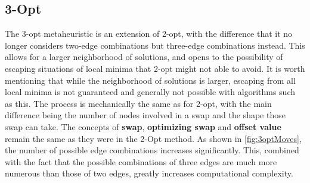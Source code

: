 \subsection{3-Opt}
The 3-opt metaheuristic is an extension of 2-opt, with the difference that it no longer considers two-edge combinations but three-edge combinations instead.
This allows for a larger neighborhood of solutions, and opens to the possibility of escaping situations of local minima that 2-opt might not able to avoid.
It is worth mentioning that while the neighborhood of solutions is larger, escaping from all local minima is not guaranteed and generally not possible with algorithms such as this.
The process is mechanically the same as for 2-opt, with the main difference being the number of nodes involved in a swap and the shape those swap can take.
The concepts of \textbf{swap}, \textbf{optimizing swap} and \textbf{offset value} remain the same as they were in the 2-Opt method.
As shown in \figurename{ \ref{fig:3optMoves}}, the number of possible edge combinations increases significantly.
This, combined with the fact that the possible combinations of three edges are much more numerous than those of two edges, greatly increases computational complexity.


